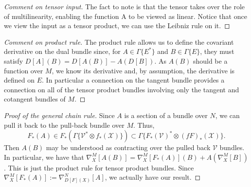 \documentclass[11pt]{article}
\theoremstyle{remark}
\begin{document}
\begin{proof}[{Comment on tensor input}] {


The fact to note is that the tensor takes over the role of
multilinearity, enabling the function A to be viewed as linear. Notice
that once we view the input as a tensor product, we can use the
Leibniz rule on it. }
 \end{proof}


\begin{proof}[{Comment on product rule}] {
 The product rule allows us to define the 
covariant derivative on the dual bundle since, for $A \in
 \ensuremath{\Gamma \{ \ensuremath{{E}^{*}} \}}$ and $B \in \ensuremath{\Gamma \{ E \}}$, they must satisfy 
$\ensuremath{D^{} [{A}] ({B}) } = \ensuremath{D^{} [{A(B)}] {} } - A(\ensuremath{D^{} [{B}] {} })$. As $A(B)$ should be
 a function over $M$, we know its derivative and, by assumption, the
 derivative is defined on $E$. In particular a connection on the
 tangent bundle provides a connection on all of the tensor product
 bundles involving only the tangent and cotangent bundles of $M$.


}
 \end{proof} 


\begin{proof}[Proof of the general chain rule]
Since $A$ is a section of a bundle over $N$, we can pull it back to
the pull-back bundle over $M$. Thus, \[\ensuremath{{F}_{*}({A})} \in
\ensuremath{{F}_{*}({\ensuremath{\Gamma \{ \ensuremath{{\ensuremath{\mathcal{V}}}^{*}} \otimes \ensuremath{{f}_{*}({\ensuremath{\mathcal{X}}})} \}}})} \subset
\ensuremath{\Gamma \{ \ensuremath{{\ensuremath{{F}_{*}({\ensuremath{\mathcal{V}}})}}^{*}} \otimes \ensuremath{{(fF)}_{*}({\ensuremath{\mathcal{X}}})} \}}. \]  
Then $A(B)$ may be understood as contracting over the pulled back
 $\ensuremath{\mathcal{V}}$ bundles. In
particular, we have that $\ensuremath{{{\nabla}}_{X}^{M}{[A(B)]}} = \ensuremath{{{\nabla}}_{X}^{M}{[\ensuremath{{F}_{*}({A})}]}}(B) +
A(\ensuremath{{{\nabla}}_{X}^{M}{[B]}})$. This is just the product rule for tensor product
bundles. Since $\ensuremath{{{\nabla}}_{X}^{M}{[\ensuremath{{F}_{*}({A})}]}} \ensuremath{:=}
\ensuremath{{{\nabla}}_{\ensuremath{D^{} [{F}] ({X}) }}^{N}{[A]}}$, we actually have our result.
\end{proof}
\end{document}
